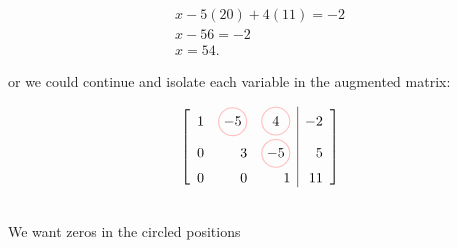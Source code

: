 \documentclass{report}
\begin{document}
{\begin{multicols}{2}
     \break
      \begin{align*}
        x - 5 \left( 20 \right) +4 \left( 11 \right) = -2\\
        x - 56=-2\\
        x = 54
      .\end{align*}
     \end{multicols}
       or we could continue and isolate each variable in the augmented matrix:
       \raggedcolumns
       \begin{multicols}{2}
       



         \[
\left[
\begin{array}{rrr|r}
 1 &
 \tikz[baseline=(c1.base)]{
      \node[inner sep=1pt] (c1){\(-5\)};
      \draw[pink,thick] (c1.center) circle [radius=10pt];
 } &
 \tikz[baseline=(c2.base)]{
      \node[inner sep=1pt] (c2){\(4\)};
      \draw[pink,thick] (c2.center) circle [radius=10pt];
 } & -2 \\[6pt]
 0 & 3 &
 \tikz[baseline=(c3.base)]{
      \node[inner sep=1pt] (c3){\(-5\)};
      \draw[pink,thick] (c3.center) circle [radius=10pt];
 } &  5 \\[6pt]
 0 & 0 &  1 & 11
\end{array}
\right]
\]
       
       \break
       \\
       We want zeros in the circled positions
       \end{multicols}

}
\end{document}
